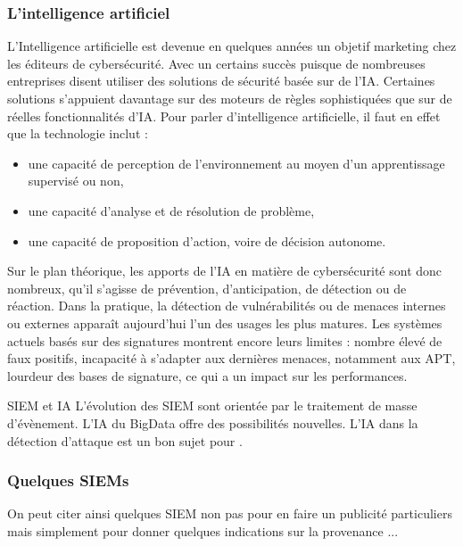 \subsubsection{L'intelligence artificiel}


L’Intelligence artificielle est devenue en quelques années un objetif marketing chez les éditeurs de cybersécurité. Avec un certains succès puisque de nombreuses entreprises disent  utiliser des solutions de sécurité basée sur de l’IA. Certaines solutions s’appuient davantage sur des moteurs de règles sophistiquées que sur de réelles fonctionnalités d’IA. Pour parler d’intelligence artificielle, il faut en effet que la technologie inclut : 

\begin{itemize}
  \item  une capacité de perception de l’environnement au moyen d’un apprentissage supervisé ou non,
  \item  une capacité d’analyse et de résolution de problème, 
  \item   une capacité de proposition d’action, voire de décision autonome.
\end{itemize}

Sur le plan théorique, les apports de l’IA en matière de cybersécurité sont donc nombreux, qu’il s’agisse de prévention, d’anticipation, de détection ou de réaction. Dans la pratique, la détection de vulnérabilités ou de menaces internes ou externes apparaît aujourd’hui l’un des usages les plus matures.  Les systèmes actuels basés sur des signatures montrent encore leurs limites : nombre élevé de faux positifs, incapacité à s’adapter aux dernières menaces, notamment aux APT, lourdeur des bases de signature, ce qui a un impact sur les performances. 

\begin{techworkbox}{SIEM et IA}
L'évolution des SIEM sont orientée par le traitement de masse d'évènement. L'IA du BigData offre des possibilités nouvelles.  L'IA dans la détection d'attaque est un bon sujet pour \fichetech.
\end{techworkbox}

\subsubsection{Quelques SIEMs}

On peut citer  ainsi quelques SIEM non pas pour en faire un publicité particuliers mais simplement pour donner quelques indications sur la provenance ...

